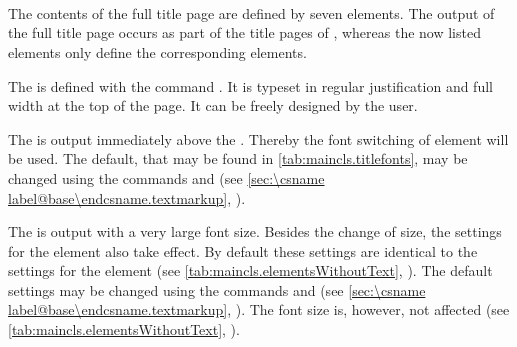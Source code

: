 \begin{Declaration}
  \\
  \\
  \\
  \\
  \\
  \\
  \\
  \\
\end{Declaration}%
%
%
%
%
%
%
%
%
%
The contents of the full title page are defined by seven elements. The output
of the full title page occurs as part of the title pages of ,
whereas the now listed elements only define the corresponding elements.

The 
 is defined with the command
. It is typeset in regular justification and full width at
the top of the page. It can be freely designed by the user.

The  is
output immediately above the .
Thereby the font switching of element
will be used. The default, that may be found in
\autoref{tab:maincls.titlefonts}, %
%
may be changed using the commands  and
 (see \autoref{sec:\csname
  label@base\endcsname.textmarkup}, ).

The  is output with a very large font
size.  Besides the change of size,
the settings for the element
also take effect. By default these settings are identical to the settings for
the element  (see
\autoref{tab:maincls.elementsWithoutText},
). The default settings may be
changed using the commands  and  (see
\autoref{sec:\csname label@base\endcsname.textmarkup},
).  The font
size is, however, not affected (see
\autoref{tab:maincls.elementsWithoutText},
).

